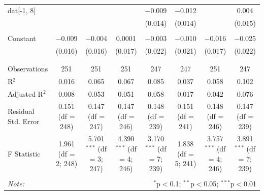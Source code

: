 \begin{table}[!htbp]
\begin{tabular}{@{\extracolsep{5pt}}lccccccc}
 dat[-1, 8] &  &  &  & $-$0.009 & $-$0.012 &  & 0.004 \\ 
  &  &  &  & (0.014) & (0.014) &  & (0.015) \\ 
  & & & & & & & \\ 
 Constant & $-$0.009 & $-$0.004 & 0.0001 & $-$0.003 & $-$0.010 & $-$0.016 & $-$0.025 \\ 
  & (0.016) & (0.016) & (0.017) & (0.022) & (0.021) & (0.017) & (0.022) \\ 
  & & & & & & & \\ 
\hline \\[-1.8ex] 
Observations & 251 & 251 & 251 & 247 & 247 & 251 & 247 \\ 
R$^{2}$ & 0.016 & 0.065 & 0.067 & 0.085 & 0.037 & 0.058 & 0.102 \\ 
Adjusted R$^{2}$ & 0.008 & 0.053 & 0.051 & 0.058 & 0.017 & 0.042 & 0.076 \\ 
Residual Std. Error & 0.151 (df = 248) & 0.147 (df = 247) & 0.147 (df = 246) & 0.148 (df = 239) & 0.151 (df = 241) & 0.148 (df = 246) & 0.147 (df = 239) \\ 
F Statistic & 1.961 (df = 2; 248) & 5.701$^{***}$ (df = 3; 247) & 4.390$^{***}$ (df = 4; 246) & 3.170$^{***}$ (df = 7; 239) & 1.838 (df = 5; 241) & 3.757$^{***}$ (df = 4; 246) & 3.891$^{***}$ (df = 7; 239) \\ 
\hline 
\hline \\[-1.8ex] 
\textit{Note:}  & \multicolumn{7}{r}{$^{*}$p$<$0.1; $^{**}$p$<$0.05; $^{***}$p$<$0.01} \\ 
\end{tabular} 
\end{table} 
